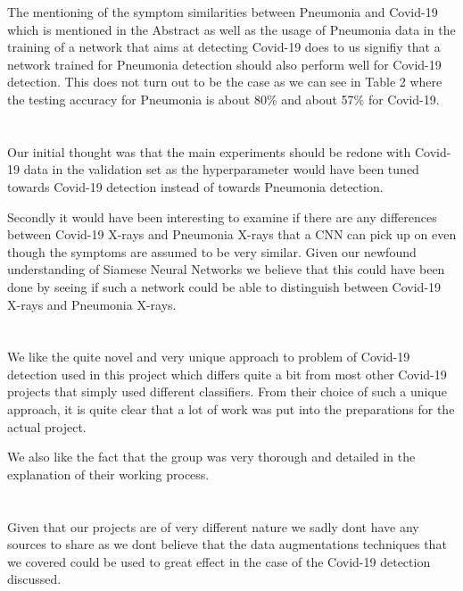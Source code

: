 \documentclass{article}
\begin{document}
The mentioning of the symptom similarities between Pneumonia and Covid-19 which is mentioned in the Abstract as well as the usage of Pneumonia data in the training of a network that aims at detecting Covid-19 does to us signifiy that a network trained for Pneumonia detection should also perform well for Covid-19 detection. This does not turn out to be the case as we can see in Table 2 where the testing accuracy for Pneumonia is about 80\% and about 57\% for Covid-19.

\section{}

Our initial thought was that the main experiments should be redone with Covid-19 data in the validation set as the hyperparameter would have been tuned towards Covid-19 detection instead of towards Pneumonia detection.

Secondly it would have been interesting to examine if there are any differences between Covid-19 X-rays and Pneumonia X-rays that a CNN can pick up on even though the symptoms are assumed to be very similar. Given our newfound understanding of Siamese Neural Networks we believe that this could have been done by seeing if such a network could be able to distinguish between Covid-19 X-rays and Pneumonia X-rays.

\section{}

We like the quite novel and very unique approach to problem of Covid-19 detection used in this project which differs quite a bit from most other Covid-19 projects that simply used different classifiers. From their choice of such a unique approach, it is quite clear that a lot of work was put into the preparations for the actual project.

We also like the fact that the group was very thorough and detailed in the explanation of their working process. 

\section{}

Given that our projects are of very different nature we sadly dont have any sources to share as we dont believe that the data augmentations techniques that we covered could be used to great effect in the case of the Covid-19 detection discussed.
\end{document}
